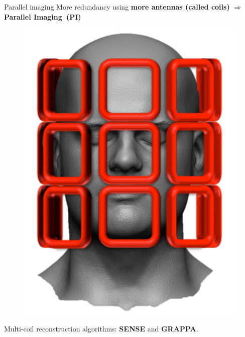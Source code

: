 \begin{frame}{Parallel imaging}
    More redundancy using \textbf{more antennas (called coils)} $\Rightarrow$ \textbf{Parallel Imaging~(PI)}
    \begin{figure}
        \centering
        \includegraphics[height=0.4\textheight]{Figures/intro_figures/multicoil.jpg}
    \end{figure}
     
    Multi-coil reconstruction algorithms: \textbf{SENSE} and \textbf{GRAPPA}.
\end{frame}

